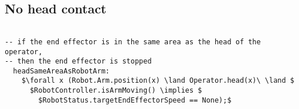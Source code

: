 \subsection{No head contact}

\begin{lstlisting}[fontadjust, mathescape, frame=single]

-- if the end effector is in the same area as the head of the operator, 
-- then the end effector is stopped
  headSameAreaAsRobotArm:
    $\forall x (Robot.Arm.position(x) \land Operator.head(x)\ \land $
      $RobotController.isArmMoving() \implies $
        $RobotStatus.targetEndEffectorSpeed == None);$

\end{lstlisting}

